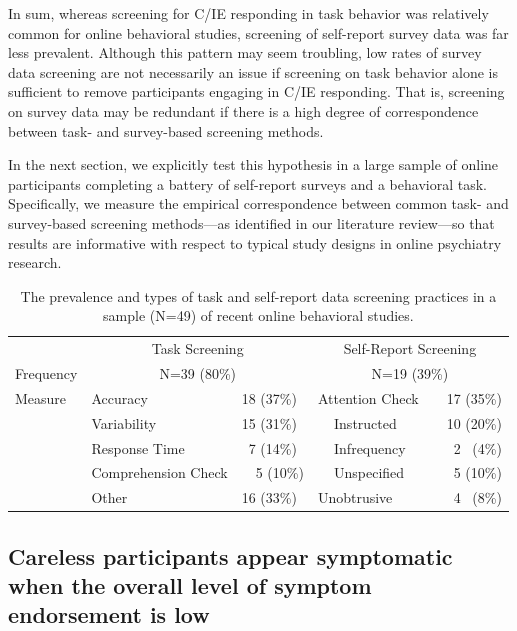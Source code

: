\documentclass[a4paper,notitlepage,12pt]{article}
\begin{document}
\begin{refsection}[main]
In sum, whereas screening for C/IE responding in task behavior was relatively common for online behavioral studies, screening of self-report survey data was far less prevalent. Although this pattern may seem troubling, low rates of survey data screening are not necessarily an issue if screening on task behavior alone is sufficient to remove participants engaging in C/IE responding. That is, screening on survey data may be redundant if there is a high degree of correspondence between task- and survey-based screening methods. 

In the next section, we explicitly test this hypothesis in a large sample of online participants completing a battery of self-report surveys and a behavioral task. Specifically, we measure the empirical correspondence between common task- and survey-based screening methods---as identified in our literature review---so that results are informative with respect to typical study designs in online psychiatry research.

\begin{table}[t]
\centering
\small
\setlength{\tabcolsep}{8pt}
\begin{tabular}{lllrllr}
\toprule
& \multicolumn{2}{c}{Task Screening} & \multicolumn{4}{c}{Self-Report Screening} \\
\cmidrule(lr){2-3} \cmidrule(lr){4-7}
Frequency & \multicolumn{2}{c}{N=39 (80\%)} & \multicolumn{4}{c}{N=19 (39\%)} \\
\midrule
Measure & Accuracy & 18 (37\%) & \multicolumn{2}{l}{Attention Check} & & 17 (35\%) \\
& Variability & 15 (31\%) & & Instructed & & 10 (20\%) \\
& Response Time & \ 7 (14\%) & & Infrequency & & 2 \, (4\%) \\
& Comprehension Check & \ \ 5 (10\%) & & Unspecified & & 5 (10\%) \\
& Other & 16 (33\%) & \multicolumn{2}{l}{Unobtrusive} & & \ 4 \, (8\%) \\
\bottomrule
\end{tabular}
\captionsetup{width=0.88\textwidth}
\caption{The prevalence and types of task and self-report data screening practices in a sample (N=49) of recent online behavioral studies.}
\label{tab:screening}
\end{table}

\subsection{Careless participants appear symptomatic when the overall level of symptom endorsement is low}


\end{refsection}
\end{document}
